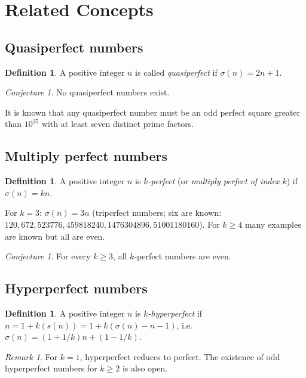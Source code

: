 \documentclass[12pt,a4paper]{amsart}
\theoremstyle{definition}
\newtheorem{definition}[theorem]{Definition}
\theoremstyle{remark}
\newtheorem{remark}[theorem]{Remark}
\newtheorem{conjecture}[theorem]{Conjecture}
\begin{document}
\section{Related Concepts}

\subsection{Quasiperfect numbers}

\begin{definition}
A positive integer $n$ is called \emph{quasiperfect} if $\sigma(n) = 2n + 1$.
\end{definition}

\begin{conjecture}
No quasiperfect numbers exist.
\end{conjecture}

It is known that any quasiperfect number must be an odd perfect square greater
than $10^{35}$ with at least seven distinct prime factors.

\subsection{Multiply perfect numbers}

\begin{definition}
A positive integer $n$ is \emph{$k$-perfect} (or \emph{multiply perfect of
index $k$}) if $\sigma(n) = kn$.
\end{definition}

For $k = 3$: $\sigma(n) = 3n$ (triperfect numbers; six are known:
$120, 672, 523776, 459818240, 1476304896, 51001180160$).
For $k \geq 4$ many examples are known but all are even.

\begin{conjecture}
For every $k \geq 3$, all $k$-perfect numbers are even.
\end{conjecture}

\subsection{Hyperperfect numbers}

\begin{definition}
A positive integer $n$ is \emph{$k$-hyperperfect} if
$n = 1 + k(s(n)) = 1 + k(\sigma(n) - n - 1)$, i.e.\ $\sigma(n) = (1+1/k)n + (1-1/k)$.
\end{definition}

\begin{remark}
For $k = 1$, hyperperfect reduces to perfect.
The existence of odd hyperperfect numbers for $k \geq 2$ is also open.
\end{remark}
\end{document}
